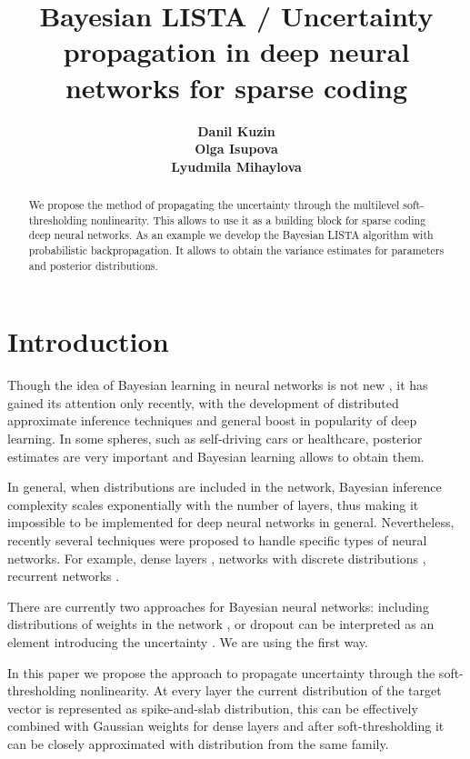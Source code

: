 \documentclass[letterpaper]{article}
\title{Bayesian LISTA / Uncertainty propagation in deep neural networks for sparse coding}
\author{} %
\author{ {\bf Danil Kuzin} \\
\And
{\bf Olga Isupova}  \\
\And
{\bf Lyudmila Mihaylova}   \\
}
\begin{document}
\maketitle

\begin{abstract}
We propose the method of propagating the uncertainty through the multilevel soft-thresholding nonlinearity. This allows to use it as a building block for sparse coding deep neural networks. As an example we develop the Bayesian LISTA algorithm with probabilistic backpropagation. It allows to obtain the variance estimates for parameters and posterior distributions.
\end{abstract}

\section{Introduction}
Though the idea of Bayesian learning in neural networks is not new \cite{neal2012bayesian}, it has gained its attention only recently, with the development of distributed approximate inference techniques \cite{li2015stochastic, hoffman2013stochastic}  and general boost in popularity of deep learning. In some spheres, such as self-driving cars or healthcare, posterior estimates are very important and Bayesian learning allows to obtain them. 

In general, when distributions are included in the network, Bayesian inference complexity scales exponentially with the number of layers, thus making it impossible to be implemented for deep neural networks in general. Nevertheless, recently several techniques were proposed to handle specific types of neural networks. For example, dense layers \cite{hernandez2015probabilistic}, networks with discrete distributions \cite{soudry2014expectation}, recurrent networks \cite{mcdermott2017bayesian}. 

There are currently two approaches for Bayesian neural networks: including distributions of weights in the network \cite{hernandez2015probabilistic, ranganath2015deep}, or dropout can be interpreted as an element introducing the uncertainty \cite{gal2016dropout}. We are using the first way.

In this paper we propose the approach to propagate uncertainty through the soft-thresholding nonlinearity. At every layer the current distribution of the target vector is represented as spike-and-slab distribution, this can be effectively combined with Gaussian weights for dense layers and after soft-thresholding it can be closely approximated with distribution from the same family.
\end{document}
